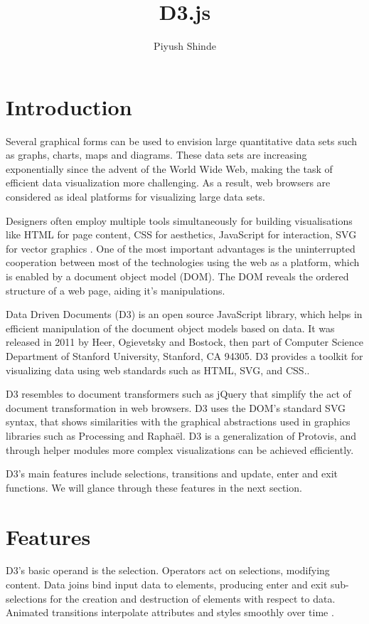 \documentclass[9pt,twocolumn,twoside]{../../styles/osajnl}
\title{D3.js}
\author[1,*]{Piyush Shinde}
\affil[1]{School of Informatics and Computing, Bloomington, IN 47408, U.S.A.}
\affil[*]{Corresponding authors: piyushsshinde1992@gmail.com}
\begin{document}
\maketitle

\section{Introduction}

Several graphical forms can be used to envision large quantitative data sets such as graphs, charts, maps and diagrams. These data sets are increasing exponentially since the advent of the World Wide Web, making the task of efficient data visualization more challenging. As a result, web browsers are considered as ideal platforms for visualizing large data sets.

Designers often employ multiple tools simultaneously for building visualisations like HTML for page content, CSS for aesthetics, JavaScript for interaction, SVG for vector graphics \cite{paper-d3}. One of the most important advantages is the uninterrupted cooperation between most of the technologies using the web as a platform, which is enabled by a document object model (DOM). The DOM reveals the ordered structure of a web page, aiding it's manipulations.  

Data Driven Documents (D3) is an open source JavaScript library, which helps in efficient manipulation of the document object models based on data. It was released in 2011 by Heer, Ogievetsky and Bostock, then part of Computer Science Department of Stanford University, Stanford, CA 94305. D3 provides a toolkit for visualizing data using web standards such as HTML, SVG, and CSS.\cite{www-git}. 

D3 resembles to document transformers such as jQuery that simplify the act of document transformation in web browsers. D3 uses the DOM’s standard SVG syntax, that shows similarities with the graphical abstractions used in graphics libraries such as Processing and Raphaël. D3 is a generalization of Protovis, and through helper modules more complex visualizations can be  achieved efficiently. 

D3's main features include selections, transitions and update, enter and exit functions. We will glance through these features in the next section.

\section{Features}
D3’s basic operand is the selection. Operators act on selections, modifying content. Data joins bind input data to elements, producing enter and exit sub-selections for the creation and destruction of elements with respect to data. Animated transitions interpolate attributes and styles smoothly over time \cite{paper-d3}.
 
\end{document}
